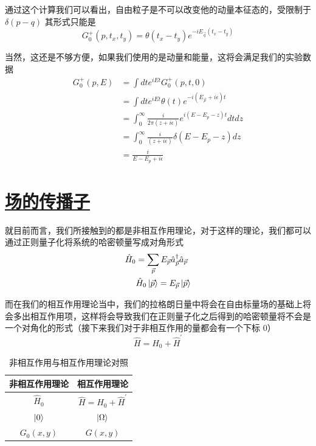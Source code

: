 通过这个计算我们可以看出，自由粒子是不可以改变他的动量本征态的，受限制于 $\delta(p - q)$ 其形式只能是
\begin{equation*}
    G^{+}_0(p,t_x,t_y) = \theta(t_x - t_y)e^{-iE_{\vec{q}}(t_x - t_y)}
\end{equation*}

当然，这还是不够方便，如果我们使用的是动量和能量，这将会满足我们的实验数据
\begin{align*}
    G_0^{+}(p,E) &= \int dt e^{iEt}G_0^{+}(p,t,0) \\
    &= \int dt e^{iEt}\theta(t)e^{-i(E_{\vec{p}} + i\epsilon) t} \\
    &= \int_{0}^{\infty} \frac{i}{2\pi(z + i\epsilon)} e^{i(E - E_p -z)t}dt dz\\
    &= \int_{0}^{\infty} \frac{i}{(z + i\epsilon)} \delta(E - E_p -z) dz\\
    &= \frac{i}{E - E_p + i\epsilon}
\end{align*}

\section{\protect\hyperlink{:}{场的传播子}}


就目前而言，我们所接触到的都是非相互作用理论，对于这样的理论，我们都可以通过正则量子化将系统的哈密顿量写成对角形式
\begin{align*}
    \hat{H}_0 &= \sum_{\vec{p}}E_{\vec{p}}\hat{a}_{\vec{p}}^\dagger\hat{a}_{\vec{p}} \\
    &\hat{H}_0\ket{\vec{p}} = E_{\vec{p}}\ket{\vec{p}} 
\end{align*}

而在我们的相互作用理论当中，我们的拉格朗日量中将会在自由标量场的基础上将会多出相互作用项，这样将会导致我们在正则量子化之后得到的哈密顿量将不会是一个对角化的形式（接下来我们对于非相互作用的量都会有一个下标 $0$）
\begin{equation*}
    \hat{H} = \hat{H}_0 + \hat{H}^\prime
\end{equation*}

\begin{table}[hbpt]
    \centering
    \caption{非相互作用与相互作用理论对照}
    \begin{tabular*}{0.4\textwidth}{cc}
        \hline
        非相互作用理论 & 相互作用理论 \\ \hline
        $\hat{H}_0$ & $\hat{H} = \hat{H}_0 + \hat{H}^\prime$ \\ \hline 
        $\ket{0}$ & $\ket{\Omega}$ \\ \hline
        $G_0(x,y)$ & $G(x,y)$ \\ \hline
    \end{tabular*}
\end{table}

